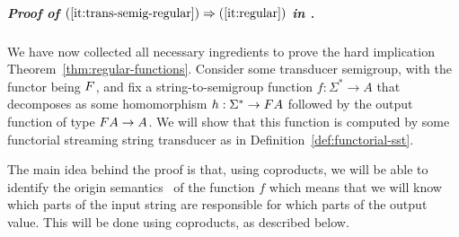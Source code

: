 

 




\subparagraph*{Proof of $(\ref{it:trans-semig-regular}) \Rightarrow (\ref{it:regular})$ in .}
We have now collected all necessary ingredients to prove the hard implication  Theorem~\ref{thm:regular-functions}. Consider some transducer semigroup, with the functor being $\functor$, and fix a string-to-semigroup function $f : \Sigma^* \to A$ that decomposes as some homomorphism $h : \Sigma^* \to \functor A$ followed by the output function of type $\functor A \to A$. 
We will show that this function  is computed by some functorial streaming string transducer as in Definition~\ref{def:functorial-sst}.

The main idea behind the proof is that, using coproducts, we will be able to identify the origin semantics~\cite{bojanczykTransducersOriginInformation2014} of the function $f$ which means that we will know which parts of the input string are responsible for which parts of the output value. This will be done using coproducts, as described below.



